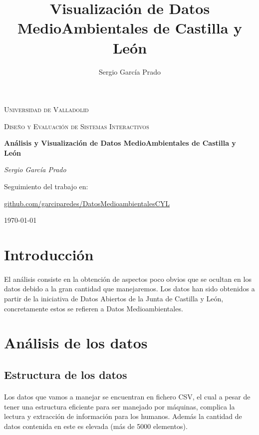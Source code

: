 \documentclass{article}
\title{Visualización de Datos MedioAmbientales de Castilla y León}
\author{Sergio García Prado}
\begin{document}
	\begin{titlepage}
		\centering
		{\scshape\LARGE Universidad de Valladolid \par}
		\vspace{1cm}
		{\scshape\Large Diseño y Evaluación de Sistemas Interactivos\par}
		\vspace{1.5cm}
		{\huge\bfseries Análisis y Visualización de Datos MedioAmbientales de Castilla y León\par}
		\vspace{2cm}
		{\Large\itshape Sergio García Prado\par}
	
		\vfill
		Seguimiento del trabajo en: \par
		\href{https://github.com/garciparedes/DatosMedioambientalesCYL}{github.com/garciparedes/DatosMedioambientalesCYL}
		\vfill


		{\large \today\par}
	\end{titlepage}



	\newpage
		\tableofcontents
	\newpage


	\section{Introducción}


		\paragraph{}
		El análisis consiste en la obtención de aspectos poco obvios que se ocultan en los datos debido a la gran cantidad que manejaremos. Los datos han sido obtenidos a partir de la iniciativa de Datos Abiertos de la Junta de Castilla y León, concretamente estos se refieren a Datos Medioambientales.
		


	\section{Análisis de los datos}


		\subsection{Estructura de los datos}
			
			\paragraph{}
			Los datos que vamos a manejar se encuentran en fichero CSV, el cual a pesar de tener una estructura eficiente para ser manejado por máquinas, complica la lectura y extracción de información para los humanos. Además la cantidad de datos contenida en este es elevada (más de 5000 elementos).
			
\end{document}
